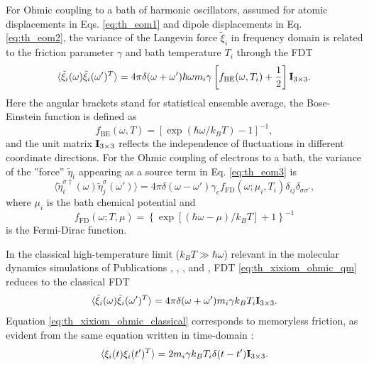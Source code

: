 For Ohmic coupling to a bath of harmonic oscillators, assumed for atomic displacements in Eqs. \eqref{eq:th_eom1} and dipole displacements in Eq. \eqref{eq:th_eom2}, the variance of the Langevin force $\tilde{\xi}_i$ in frequency domain is related to the friction parameter $\gamma$ and bath temperature $T_i$ through the FDT \cite{weiss,dhar06}
\begin{equation}
 \langle \tilde \xi_i(\omega) \tilde \xi_i(\omega')^T \rangle = 4\pi \delta(\omega+\omega') \hbar \omega m_i \gamma \left[f_{\textrm{BE}}(\omega,T_i)+ \frac{1}{2} \right] \mathbf{I}_{3\times 3}. \label{eq:th_xixiom_ohmic_qm}
\end{equation}
Here the angular brackets stand for statistical ensemble average, the Bose-Einstein function is defined as
\begin{equation}
 f_{\textrm{BE}}(\omega,T)=\left[\exp(\hbar \omega/k_BT)-1\right]^{-1}, \label{eq:th_fBE}
\end{equation}
and the unit matrix $\mathbf{I}_{3 \times 3}$ reflects the independence of fluctuations in different coordinate directions. For the Ohmic coupling of electrons to a bath, the variance of the ''force'' $\tilde{\eta}_i$ appearing as a source term in Eq. \eqref{eq:th_eom3} is \cite{dhar03,dhar06b,roy07}
\begin{equation}
 \langle \tilde \eta_{i}^{\sigma\dagger}(\omega) \tilde \eta_{j}^{\sigma}(\omega') \rangle = 4\pi\delta(\omega-\omega') \gamma_e f_{\textrm{FD}}(\omega;\mu_{i},T_{i}) \delta_{ij}\delta_{\sigma\sigma'}, \label{eq:th_etaetaom}
\end{equation}
where $\mu_i$ is the bath chemical potential and 
\begin{equation}
 f_{\textrm{FD}}(\omega;T,\mu)=\left\{\exp\left[(\hbar \omega-\mu)/k_BT\right]+1\right\}^{-1}
\end{equation}
is the Fermi-Dirac function.


In the classical high-temperature limit ($k_B T \gg \hbar \omega$) relevant in the molecular dynamics simulations of Publications , , , and , FDT \eqref{eq:th_xixiom_ohmic_qm} reduces to the classical FDT
\begin{equation}
 \langle \tilde \xi_i(\omega) \tilde \xi_i(\omega')^T \rangle = 4\pi \delta(\omega+\omega') m_i \gamma k_B T_i  \mathbf{I}_{3\times 3}. \label{eq:th_xixiom_ohmic_classical}
\end{equation}
Equation \eqref{eq:th_xixiom_ohmic_classical} corresponds to memoryless friction, as evident from the same equation written in time-domain \cite{zwanzig}:
\begin{equation}
 \langle \xi_i(t)  \xi_i(t')^T \rangle = 2 m_i \gamma k_B T_i \delta(t-t') \mathbf{I}_{3\times 3}. \label{eq:th_xixit_ohmic_classical}
\end{equation}

